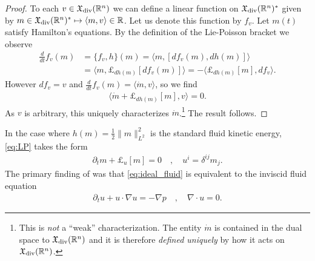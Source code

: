 \documentclass[12pt]{amsart}
\newcommand{\R}{\ensuremath{\mathbb{R}}}
\begin{document}
\begin{proof}
  To each $v \in \mathfrak{X}_{\rm div}(\R^n)$
  we can define a linear function on $\mathfrak{X}_{\rm div}(\R^n)^*$
  given by $m \in \mathfrak{X}_{\rm div}(\R^n)^* \mapsto \langle m , v \rangle \in \R$.
  Let us denote this function by $f_v$.
  Let $m(t)$ satisfy Hamilton's equations.
  By the definition of the Lie-Poisson bracket we observe
  \begin{align*}
    \frac{d}{dt} f_v(m) &= \{ f_v , h \}(m) = \langle m , [ df_v(m) , dh(m) ] \rangle \\
    &= \langle m , \pounds_{dh(m)}[ df_v(m) ] \rangle = - \langle \pounds_{dh(m)}[m] , df_v \rangle.
  \end{align*}
  However $df_v = v$ and 
  $\frac{d}{dt} f_v(m) = \langle \dot{m} , v \rangle$, so we find
  \begin{align*}
    \langle \dot{m} + \pounds_{dh(m)} [m] , v \rangle = 0.  
  \end{align*}
  As $v$ is arbitrary, this uniquely characterizes $\dot{m}$.\footnote{This is \emph{not} a ``weak'' characterization.  The entity $\dot{m}$ is
  contained in the dual space to $\mathfrak{X}_{\rm div}(\R^n)$ and it is
  therefore \emph{defined uniquely} by how it acts on $\mathfrak{X}_{\rm div}(\R^n)$.}
  The result follows.
\end{proof}
In the case where $h(m) = \frac{1}{2} \| m \|^2_{L^2}$ is the standard fluid kinetic
energy, \eqref{eq:LP} takes the form 
\begin{align}
	\partial_t m+ \pounds_u [ m] = 0 \quad , \quad u^i = \delta^{ij} m_j. \label{eq:ideal_fluid}
\end{align}
The primary finding of \cite{Arnold1966} was that \eqref{eq:ideal_fluid} is equivalent to the
inviscid fluid equation
\begin{align*}
	\partial_t u + u \cdot \nabla u = - \nabla p \quad , \quad  \nabla \cdot u = 0.
\end{align*}
\end{document}
